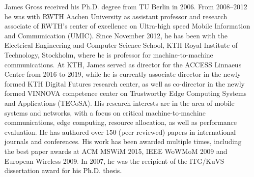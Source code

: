 \begin{IEEEbiography}%
    James Gross received his Ph.D. degree from TU Berlin in 2006.
    From 2008--2012 he was with RWTH Aachen University as assistant professor and research associate of RWTH's center of excellence on Ultra-high speed Mobile Information and Communication (UMIC).
    Since November 2012, he has been with the Electrical Engineering and Computer Science School, KTH Royal Institute of Technology, Stockholm, where he is professor for machine-to-machine communications.
    At KTH, James served as director for the ACCESS Linnaeus Centre from 2016 to 2019, while he is currently associate director in the newly formed KTH Digital Futures research center, as well as co-director in the newly formed VINNOVA competence center on Trustworthy Edge Computing Systems and Applications (TECoSA).
    His research interests are in the area of mobile systems and networks, with a focus on critical machine-to-machine communications, edge computing, resource allocation, as well as performance evaluation.
    He has authored over 150 (peer-reviewed) papers in international journals and conferences.
    His work has been awarded multiple times, including the best paper awards at ACM MSWiM 2015, IEEE WoWMoM 2009 and European Wireless 2009.
    In 2007, he was the recipient of the ITG/KuVS dissertation award for his Ph.D. thesis.
\end{IEEEbiography}